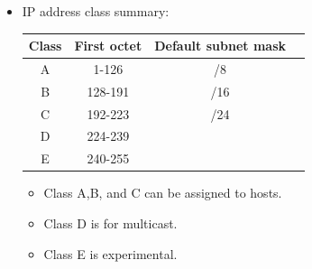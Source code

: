 \begin{itemize}
    \item IP address class summary:
        \begin{center}
            \begin{tabular}{ |c|c|c|c| }
                \hline
                    Class & First octet & Default subnet mask \\
                \hline
                    A & 1-126 & /8 \\
                    B & 128-191 & /16 \\
                    C & 192-223 & /24 \\
                    D & 224-239 &  \\
                    E & 240-255 &  \\
                \hline
            \end{tabular}
        \end{center}
        \begin{itemize}
            \item Class A,B, and C can be assigned to hosts.
            \item Class D is for multicast.
            \item Class E is experimental.
        \end{itemize}
\end{itemize}

